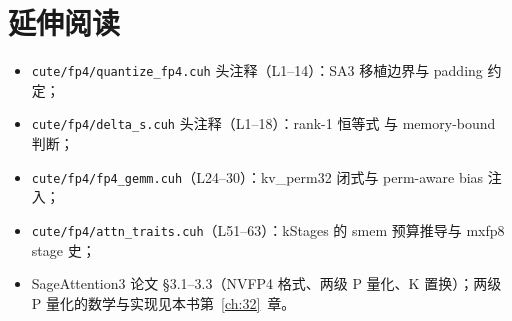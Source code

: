 \section*{延伸阅读}

\begin{itemize}[itemsep=0pt,topsep=2pt]
  \item \texttt{cute/fp4/quantize\_fp4.cuh} 头注释（L1--14）：SA3
        移植边界与 padding 约定；
  \item \texttt{cute/fp4/delta\_s.cuh} 头注释（L1--18）：rank-1 恒等式
        与 memory-bound 判断；
  \item \texttt{cute/fp4/fp4\_gemm.cuh}（L24--30）：kv\_perm32 闭式与
        perm-aware bias 注入；
  \item \texttt{cute/fp4/attn\_traits.cuh}（L51--63）：kStages 的 smem
        预算推导与 mxfp8 stage 史；
  \item SageAttention3 论文 §3.1--3.3（NVFP4 格式、两级 P 量化、K
        置换）；两级 P 量化的数学与实现见本书第~\ref{ch:32}~章。
\end{itemize}
